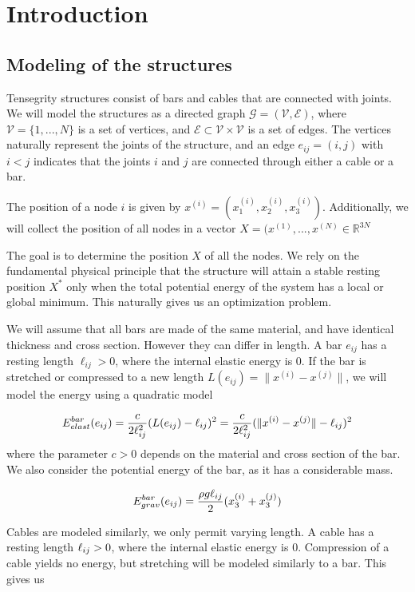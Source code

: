 \section{Introduction}
\subsection{Modeling of the structures}
Tensegrity structures consist of bars and cables that are connected with joints. We will model the structures as a directed graph $\mathcal{G} = (\mathcal{V},\mathcal{E})$, where $\mathcal{V} = \{1,...,N\}$ is a set of vertices, and $\mathcal{E} \subset \mathcal{V} \times \mathcal{V}$ is a set of edges. The vertices naturally represent the joints of the structure, and an edge $e_{ij} = (i,j)$ with $i < j$ indicates that the joints $i$ and $j$ are connected through either a cable or a bar.

The position of a node $i$ is given by $x^{(i)} = (x_1^{(i)},x_2^{(i)},x_3^{(i)})$. Additionally, we will collect the position of all nodes in a vector $X = (x^{(1)},...,x^{(N)} \in \mathbb{R}^{3N}$

The goal is to determine the position $X$ of all the nodes. We rely on the fundamental physical principle that the structure will attain a stable resting position $X^*$ only when the total potential energy of the system has a local or global minimum. This naturally gives us an optimization problem.

We will assume that all bars are made of the same material, and have identical thickness and cross section. However they can differ in length. A bar $e_{ij}$ has a resting length $\ell_{ij}>0$, where the internal elastic energy is $0$. If the bar is stretched or compressed to a new length $L(e_{ij})=\lVert x^{(i)} - x^{(j)}\rVert$, we will model the energy using a quadratic model


\begin{equation}
    E^{bar}_{elast}(e_{ij}) = \frac{c}{2\ell_{ij}^2}(L(e_{ij}) - \ell_{ij})^2 = \frac{c}{2 \ell_{ij}^2}(\lVert x^{(i)} - x^{(j)}\rVert - \ell_{ij})^2
    \label{barElast}
\end{equation}
where the parameter $c > 0$ depends on the material and cross section of the bar. We also consider the potential energy of the bar, as it has a considerable mass.

\begin{equation}
    E^{bar}_{grav}(e_{ij}) = \frac{\rho g \ell_{ij}}{2}(x_3^{(i)}+x_3^{(j)})
    \label{barGrav}
\end{equation}

Cables are modeled similarly, we only permit varying length. A cable has a resting length $\ell_{ij} > 0$, where the internal elastic energy is $0$. Compression of a cable yields no energy, but stretching will be modeled similarly to a bar. This gives us

